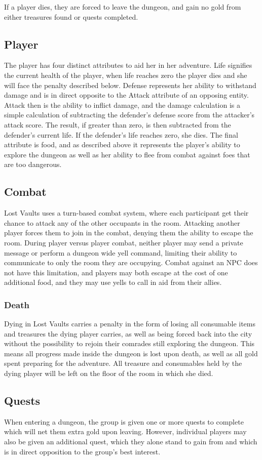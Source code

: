 \documentclass[a4paper]{article}
\begin{document}
If a player dies, they are forced to leave the dungeon, and gain no gold from either treasures found or quests completed.
\subsection{Player}
The player has four distinct attributes to aid her in her adventure. Life signifies the current health of the player, when life reaches zero the player dies and she will face the penalty 
described below. Defense represents her ability to withstand damage and is in direct opposite to the Attack attribute of an opposing entity. Attack then is the ability to inflict damage, 
and the damage calculation is a simple calculation of subtracting the defender's defense score from the attacker's attack score. The result, if greater than zero, is then subtracted from 
the defender's current life. If the defender's life reaches zero, she dies. The final attribute is food, and as described above it represents the player's ability to explore the dungeon 
as well as her ability to flee from combat against foes that are too dangerous. 
\subsection{Combat}
Lost Vaults uses a turn-based combat system, where each participant get their chance to attack any of the other occupants in the room. Attacking another player forces them to join in the 
combat, denying them the ability to escape the room. During player versus player combat, neither player may send a private message or perform a dungeon wide yell command, limiting their 
ability to communicate to only the room they are occupying. Combat against an NPC does not have this limitation, and players may both escape at the cost of one additional food, and they 
may use yells to call in aid from their allies.
\subsubsection{Death}
Dying in Lost Vaults carries a penalty in the form of losing all consumable items and treasures the dying player carries, as well as being forced back into the city without the possibility 
to rejoin their comrades still exploring the dungeon. This means all progress made inside the dungeon is lost upon death, as well as all gold spent preparing for the adventure. All treasure 
and consumables held by the dying player will be left on the floor of the room in which she died.
\subsection{Quests}
When entering a dungeon, the group is given one or more quests to complete which will net them extra gold upon leaving. However, individual players may also be given an additional quest, 
which they alone stand to gain from and which is in direct opposition to the group's best interest.
\end{document}

